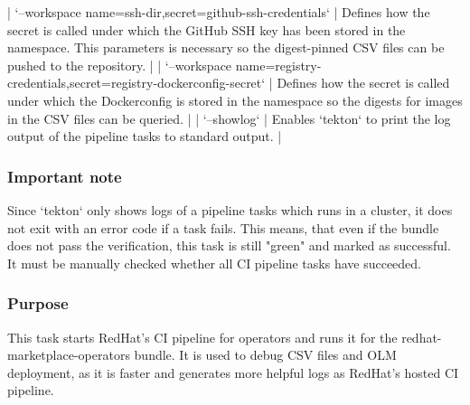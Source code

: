 | `--workspace name=ssh-dir,secret=github-ssh-credentials`                             | Defines how the secret is called under which the GitHub SSH key has been stored in the namespace. This parameters is necessary so the digest-pinned CSV files can be pushed to the repository.                                                                                                                                                                                                                             |
| `--workspace name=registry-credentials,secret=registry-dockerconfig-secret`          | Defines how the secret is called under which the Dockerconfig is stored in the namespace so the digests for images in the CSV files can be queried.                                                                                                                                                                                                                                                                        |
| `--showlog`                                                                          | Enables `tekton` to print the log output of the pipeline tasks to standard output.                                                                                                                                                                                                                                                                                                                                         |

\subsubsection{Important note}\label{subsubsec:test-redhat-marketplace-important-note}

Since `tekton` only shows logs of a pipeline tasks which runs in a cluster, it does not exit with an error code if a task fails.
This means, that even if the bundle does not pass the verification, this task is still "green" and marked as successful.
It must be manually checked whether all CI pipeline tasks have succeeded.

\subsubsection{Purpose}\label{subsubsec:test-redhat-marketplace-purpose}

This task starts RedHat's CI pipeline for operators and runs it for the redhat-marketplace-operators bundle.
It is used to debug CSV files and OLM deployment, as it is faster and generates more helpful logs as RedHat's hosted CI pipeline.
